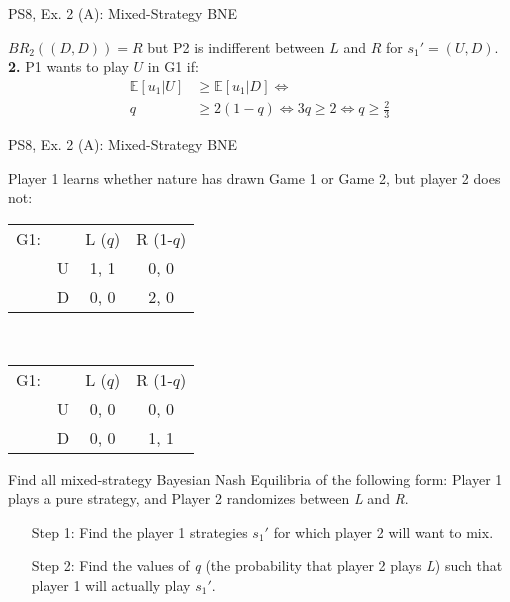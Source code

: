 \begin{frame}{PS8, Ex. 2 (A): Mixed-Strategy BNE}
\begin{multicols}{2}
      $BR_2((D,D))=R$ but P2 is indifferent between $L$ and $R$ for $s_1'=(U,D)$.\\\medskip
      \textbf{2.} P1 wants to play $U$ in G1 if:
      \begin{align*}
        \mathbb{E}[u_1|U]&\geq \mathbb{E}[u_1|D]\Leftrightarrow\\
        q&\geq2(1-q)\Leftrightarrow 3q\geq2 \Leftrightarrow q\geq\frac{2}{3}
      \end{align*}
      \vfill\null
    \end{multicols}
\end{frame}
\begin{frame}{PS8, Ex. 2 (A): Mixed-Strategy BNE}
    \begin{multicols}{2}
      Player 1 learns whether nature has drawn Game 1 or Game 2, but player 2 does not:
      \begin{table}
        \vspace{-4pt}
        \begin{tabular}{ll|c|c|}
          \multicolumn{1}{c}{G1:} & \multicolumn{1}{c}{} & \multicolumn{1}{c}{L ($q$)} & \multicolumn{1}{c}{R (1-$q$)} \\\cline{3-4}
          & U & 1, 1 & 0, 0 \\\cline{3-4}
          & D & 0, 0 & 2, 0 \\\cline{3-4}
        \end{tabular}\\\medskip
        \begin{tabular}{ll|c|c|}
          \multicolumn{1}{c}{G1:} & \multicolumn{1}{c}{} & \multicolumn{1}{c}{L ($q$)} & \multicolumn{1}{c}{R (1-$q$)} \\\cline{3-4}
          & U & 0, 0 & 0, 0 \\\cline{3-4}
          & D & 0, 0 & 1, 1 \\\cline{3-4}
        \end{tabular}
      \end{table}
      \vspace{-4pt}
      Find all mixed-strategy Bayesian Nash Equilibria of the following form: Player 1 plays a pure strategy, and Player 2 randomizes between \textit{L} and \textit{R}.
      \vspace{-4pt}
      \begin{itemize}
        \item[Step 1:] Find the player 1 strategies $s_1'$ for which player 2 will want to mix.
        \item[Step 2:] Find the values of \textit{q} (the probability that player 2 plays \textit{L}) such that player 1 will actually play $s_1'$.

\end{itemize}
\end{multicols}
\end{frame}
